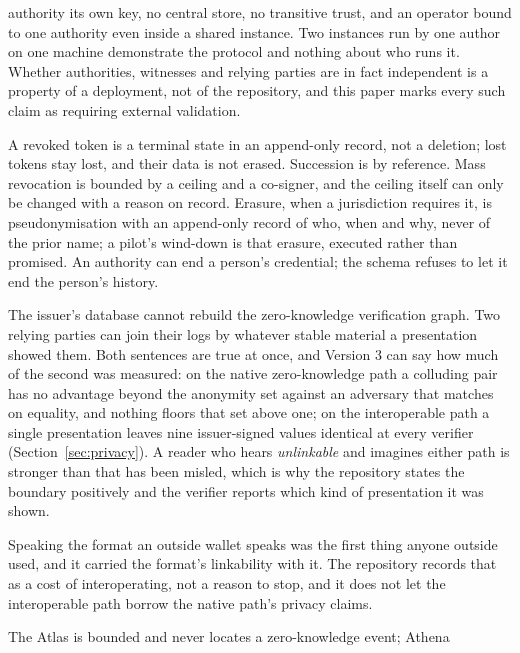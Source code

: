 \begin{description}
    authority its own key, no central store, no transitive trust, and an operator
    bound to one authority even inside a shared instance. Two instances run by one author on one
    machine demonstrate the protocol and nothing about who runs it. Whether authorities, witnesses
    and relying parties are in fact independent is a property of a deployment, not of the repository,
    and this paper marks every such claim as requiring external validation.
  \item[Revocation must not become civil erasure.] A revoked token is a terminal state in an
    append-only record, not a deletion; lost tokens stay lost, and their data is not erased.
    Succession is by reference. Mass revocation is bounded by a ceiling and a co-signer, and the
    ceiling itself can only be changed with a reason on record. Erasure, when a jurisdiction requires
    it, is pseudonymisation with an append-only record of who, when and why, never of the prior name;
    a pilot's wind-down is that erasure, executed rather than promised. An authority can end a
    person's credential; the schema refuses to let it end the person's history.
  \item[Relying-party correlation is different from issuer unlinkability.] The issuer's database
    cannot rebuild the zero-knowledge verification graph. Two relying parties can join their logs by
    whatever stable material a presentation showed them. Both sentences are true at once, and Version
    3 can say how much of the second was measured: on the native zero-knowledge path a colluding
    pair has no advantage beyond the anonymity set against an adversary that matches on equality,
    and nothing floors that set above one; on the interoperable path a single presentation leaves
    nine issuer-signed values identical at every verifier (Section~\ref{sec:privacy}). A reader who
    hears \emph{unlinkable} and imagines either path is stronger than that has been misled, which is
    why the repository states the boundary positively and the verifier reports which kind of
    presentation it was shown.
  \item[Interoperating imports the ecosystem's properties.] Speaking the format an outside wallet
    speaks was the first thing anyone outside used, and it carried the format's linkability with it.
    The repository records that as a cost of interoperating, not a reason to stop, and it does not
    let the interoperable path borrow the native path's privacy claims.
  \item[No population graph.] The Atlas is bounded and never locates a zero-knowledge event; Athena

\end{description}
